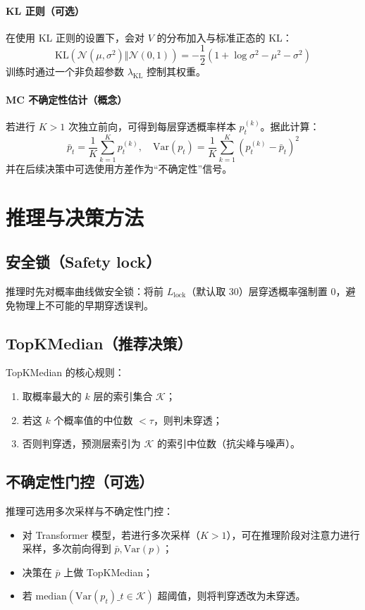 \documentclass[UTF8,a4paper,11pt]{ctexart}
\begin{document}
\paragraph{KL 正则（可选）}
在使用 KL 正则的设置下，会对 \(V\) 的分布加入与标准正态的 KL：
\[
\mathrm{KL}( \mathcal{N}(\mu,\sigma^2) \Vert \mathcal{N}(0,1) )
= -\frac{1}{2}\left(1+\log\sigma^2-\mu^2-\sigma^2\right)
\]
训练时通过一个非负超参数 \(\lambda_{\mathrm{KL}}\) 控制其权重。

\paragraph{MC 不确定性估计（概念）}
若进行 \(K>1\) 次独立前向，可得到每层穿透概率样本 \(p^{(k)}_t\)。据此计算：
\[
\bar{p}_t=\frac{1}{K}\sum_{k=1}^K p^{(k)}_t,\quad
\mathrm{Var}(p_t)=\frac{1}{K}\sum_{k=1}^K (p^{(k)}_t-\bar{p}_t)^2
\]
并在后续决策中可选使用方差作为“不确定性”信号。

\section{推理与决策方法}

\subsection{安全锁（Safety lock）}
推理时先对概率曲线做安全锁：将前 \(L_{\text{lock}}\)（默认取 30）层穿透概率强制置 0，避免物理上不可能的早期穿透误判。

\subsection{TopKMedian（推荐决策）}
TopKMedian 的核心规则：
\begin{enumerate}
  \item 取概率最大的 \(k\) 层的索引集合 \(\mathcal{K}\)；
  \item 若这 \(k\) 个概率值的中位数 \(< \tau\)，则判未穿透；
  \item 否则判穿透，预测层索引为 \(\mathcal{K}\) 的索引中位数（抗尖峰与噪声）。
\end{enumerate}

\subsection{不确定性门控（可选）}
推理可选用多次采样与不确定性门控：
\begin{itemize}
  \item 对 Transformer 模型，若进行多次采样（\(K>1\)），可在推理阶段对注意力进行采样，多次前向得到 \(\bar{p},\mathrm{Var}(p)\)；
  \item 决策在 \(\bar{p}\) 上做 TopKMedian；
  \item 若 \(\mathrm{median}(\mathrm{Var}(p_t)\_{t\in\mathcal{K}})\) 超阈值，则将判穿透改为未穿透。
\end{itemize}
\end{document}
